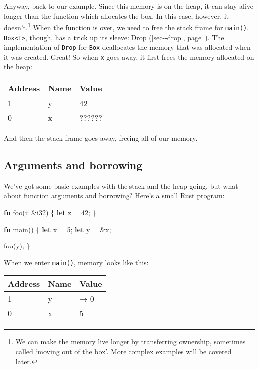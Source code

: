 \documentclass[a4paper,]{book}
\renewcommand*{\hyperref}[2][\ar]{%
  \def\ar{#2}%
  #2 (\autoref{#1}, page~\pageref{#1})}
\newenvironment{Shaded}{\begin{snugshade}}{\end{snugshade}}
\newcommand{\KeywordTok}[1]{\textcolor[rgb]{0.13,0.29,0.53}{\textbf{{#1}}}}
\newcommand{\DataTypeTok}[1]{\textcolor[rgb]{0.13,0.29,0.53}{{#1}}}
\newcommand{\DecValTok}[1]{\textcolor[rgb]{0.00,0.00,0.81}{{#1}}}
\newcommand{\NormalTok}[1]{{#1}}
\begin{document}
Anyway, back to our example. Since this memory is on the heap, it can
stay alive longer than the function which allocates the box. In this
case, however, it doesn't.\footnote{We can make the memory live longer
  by transferring ownership, sometimes called `moving out of the box'.
  More complex examples will be covered later.} When the function is
over, we need to free the stack frame for \texttt{main()}.
\texttt{Box\textless{}T\textgreater{}}, though, has a trick up its
sleeve: \hyperref[sec--drop]{Drop}. The implementation of \texttt{Drop}
for \texttt{Box} deallocates the memory that was allocated when it was
created. Great! So when \texttt{x} goes away, it first frees the memory
allocated on the heap:

\begin{longtable}[c]{@{}lll@{}}
\toprule
Address & Name & Value\tabularnewline
\midrule
\endhead
1 & y & 42\tabularnewline
0 & x & ??????\tabularnewline
\bottomrule
\end{longtable}

And then the stack frame goes away, freeing all of our memory.

\subsection{Arguments and borrowing}\label{arguments-and-borrowing}

We've got some basic examples with the stack and the heap going, but
what about function arguments and borrowing? Here's a small Rust
program:

\begin{Shaded}
\begin{Highlighting}[]
\KeywordTok{fn} \NormalTok{foo(i: &}\DataTypeTok{i32}\NormalTok{) \{}
    \KeywordTok{let} \NormalTok{z = }\DecValTok{42}\NormalTok{;}
\NormalTok{\}}

\KeywordTok{fn} \NormalTok{main() \{}
    \KeywordTok{let} \NormalTok{x = }\DecValTok{5}\NormalTok{;}
    \KeywordTok{let} \NormalTok{y = &x;}

    \NormalTok{foo(y);}
\NormalTok{\}}
\end{Highlighting}
\end{Shaded}

When we enter \texttt{main()}, memory looks like this:

\begin{longtable}[c]{@{}lll@{}}
\toprule
Address & Name & Value\tabularnewline
\midrule
\endhead
1 & y & → 0\tabularnewline
0 & x & 5\tabularnewline
\bottomrule
\end{longtable}
\end{document}

